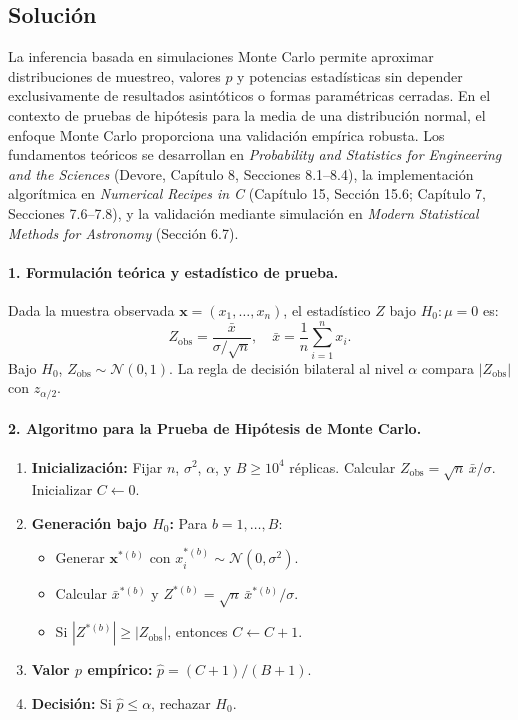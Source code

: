 \documentclass[12pt]{article}
\begin{document}
\subsection{Solución}
La inferencia basada en simulaciones Monte Carlo permite aproximar distribuciones de muestreo, valores $p$ y potencias estadísticas sin depender exclusivamente de resultados asintóticos o formas paramétricas cerradas. En el contexto de pruebas de hipótesis para la media de una distribución normal, el enfoque Monte Carlo proporciona una validación empírica robusta. Los fundamentos teóricos se desarrollan en \textit{Probability and Statistics for Engineering and the Sciences} (Devore, Capítulo 8, Secciones 8.1--8.4), la implementación algorítmica en \textit{Numerical Recipes in C} (Capítulo 15, Sección 15.6; Capítulo 7, Secciones 7.6--7.8), y la validación mediante simulación en \textit{Modern Statistical Methods for Astronomy} (Sección 6.7).

\paragraph{1. Formulación teórica y estadístico de prueba.}
Dada la muestra observada $\mathbf{x} = (x_1, \dots, x_n)$, el estadístico $Z$ bajo $H_0: \mu = 0$ es:
$$
Z_{\text{obs}} = \frac{\bar{x}}{\sigma / \sqrt{n}}, \quad \bar{x} = \frac{1}{n}\sum_{i=1}^n x_i.
$$
Bajo $H_0$, $Z_{\text{obs}} \sim \mathcal{N}(0,1)$. La regla de decisión bilateral al nivel $\alpha$ compara $|Z_{\text{obs}}|$ con $z_{\alpha/2}$.

\paragraph{2. Algoritmo para la Prueba de Hipótesis de Monte Carlo.}
\begin{enumerate}
    \item \textbf{Inicialización:} Fijar $n$, $\sigma^2$, $\alpha$, y $B \geq 10^4$ réplicas. Calcular $Z_{\text{obs}} = \sqrt{n}\,\bar{x}/\sigma$. Inicializar $C \leftarrow 0$.
    
    \item \textbf{Generación bajo $H_0$:} Para $b = 1,\dots,B$:
    \begin{itemize}
        \item Generar $\mathbf{x}^{*(b)}$ con $x_i^{*(b)} \sim \mathcal{N}(0, \sigma^2)$.
        \item Calcular $\bar{x}^{*(b)}$ y $Z^{*(b)} = \sqrt{n}\,\bar{x}^{*(b)}/\sigma$.
        \item Si $|Z^{*(b)}| \geq |Z_{\text{obs}}|$, entonces $C \leftarrow C + 1$.
    \end{itemize}
    
    \item \textbf{Valor $p$ empírico:} $\hat{p} = (C + 1)/(B + 1)$.
    
    \item \textbf{Decisión:} Si $\hat{p} \leq \alpha$, rechazar $H_0$.
\end{enumerate}
\end{document}
